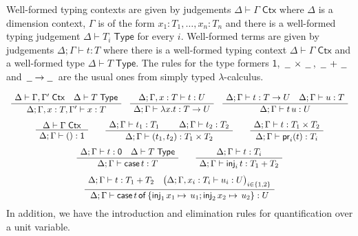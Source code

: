 \documentclass[a4paper,UKenglish]{lipics}
\newcommand{\ra}{\rightarrow}
\newcommand{\msf}[1]{\mathsf{#1}} %
\newcommand{\blank}{\, \underline{\hspace{2mm}} \,}
\newcommand{\unitTy}{\msf{1}}
\newcommand{\emptyTy}{\msf{0}}
\newcommand{\cj}[2]{#1 \vdash #2 \; \msf{ Ctx}}
\newcommand{\Tj}[2]{#1 \vdash #2 \; \msf{ Type}}
\newcommand{\tj}[4]{#1;#2 \vdash #3 : #4}
\newcommand{\proj}{\mathsf{pr}}
\newcommand{\inj}{\mathsf{inj}}
\newcommand{\emptyelim}{\mathsf{case}\,}
\newcommand{\case}[5]{\mathsf{case}\,#1\,\mathsf{of}\,\{\inj_1\,#2 \mapsto\,#3; \inj_2\,#4\mapsto\,#5\}}
\begin{document}
\vspace{3mm}  Well-formed typing contexts are given by judgements
$\cj\Delta\Gamma $ where $\Delta$ is a dimension context, $\Gamma$ is
of the form ${x_1 : T_1, \ldots, x_n:T_n}$ and there is a well-formed
typing judgement $\Tj\Delta{ T_i}$ for every $i$. Well-formed terms
are given by judgements $\tj \Delta \Gamma t T$ where there is a
well-formed typing context $\cj \Delta \Gamma$ and
a well-formed type $\Tj \Delta T $. The rules for
the type formers $\unitTy$, $\blank\times\blank$, $\blank+\blank$ and $\blank \! \ra \! \blank$ are the usual ones from
simply typed $\lambda$-calculus.

\[\begin{array}{c}%
\AxiomC{%
$\cj \Delta{\Gamma,\Gamma'}\quad
\Tj\Delta T$}
\UnaryInfC
{$\tj \Delta{\Gamma,x:T,\Gamma'}xT$}
\DisplayProof
\quad
\AxiomC{%
$
\tj\Delta {\Gamma,x:T} {t}{U}
$%
}
\UnaryInfC
{$\tj\Delta {\Gamma} {\lambda x.t}{T\to U}$}
\DisplayProof
\quad
\AxiomC{%
$
\tj\Delta {\Gamma} {t}{T\to U}\quad
\tj\Delta {\Gamma} {u}{T}
$%
}
\UnaryInfC
{$\tj \Delta{\Gamma}{t\,u}U$}
\DisplayProof
\\[5mm]
\AxiomC{%
$\cj\Delta {\Gamma}
$%
}
\UnaryInfC
{$\tj \Delta{\Gamma}{()}\unitTy$}
\DisplayProof
\qquad
\AxiomC{$\tj\Delta {\Gamma} {t_1}{T_1}$}
\AxiomC{$\tj\Delta {\Gamma} {t_2}{T_2}$}
\BinaryInfC
{$\tj \Delta{\Gamma}{(t_1,t_2)}{T_1\times T_2}$}
\DisplayProof
\qquad
\AxiomC{%
$
\tj\Delta {\Gamma} {t}{T_1\times T_2}
$%
}
\UnaryInfC
{$\tj\Delta {\Gamma} {\proj_i(t)}{T_i}$}
\DisplayProof
\\[5mm]
\AxiomC{%
$
\tj\Delta {\Gamma} {t}{\emptyTy}
\quad \Tj\Delta T$%
}
\UnaryInfC
{$\tj\Delta {\Gamma} {\emptyelim t}{T}$}
\DisplayProof
\qquad
\AxiomC{%
$
\tj\Delta {\Gamma} {t}{T_i}$}
\UnaryInfC
{$\tj\Delta {\Gamma} {\inj_i\,t}{T_1 + T_2}$}
\DisplayProof
\\[5mm]
\AxiomC{$\tj\Delta {\Gamma} {t}{T_1 + T_2}
\quad \big(\tj\Delta {\Gamma, x_i : T_i} {u_i}{U}\big)_{i\in\{1,2\}}$}
\UnaryInfC
{$\tj\Delta {\Gamma} {\case{t}{x_1}{u_1}{x_2}{u_2}}{U}$}
\DisplayProof
\end{array}\]
%
In addition, we have the introduction and elimination rules for quantification over a unit variable.
\end{document}
